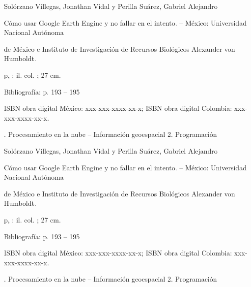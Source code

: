 \newpage

\vspace*{\fill}
\begin{center}
    \begin{blackbox}
        {\footnotesize Solórzano Villegas, Jonathan Vidal y Perilla Suárez, Gabriel Alejandro

        \quad Cómo usar Google Earth Engine y no fallar en el intento. – México: Universidad Nacional Autónoma 
            
        \quad de México e Instituto de Investigación de Recursos Biológicos Alexander von Humboldt.

         p, : il. col. ; 27 cm.

        \quad Bibliografía: p. 193 – 195

        \quad ISBN obra digital México: xxx-xxx-xxxx-xx-x; ISBN obra digital Colombia: xxx-xxx-xxxx-xx-x.

        . Procesamiento en la nube – Información geoespacial 2. Programación}
        
    \end{blackbox}
    \begin{blackbox}
        {\footnotesize Solórzano Villegas, Jonathan Vidal y Perilla Suárez, Gabriel Alejandro

        \quad Cómo usar Google Earth Engine y no fallar en el intento. – México: Universidad Nacional Autónoma 
            
        \quad de México e Instituto de Investigación de Recursos Biológicos Alexander von Humboldt.

         p, : il. col. ; 27 cm.

        \quad Bibliografía: p. 193 – 195

        \quad ISBN obra digital México: xxx-xxx-xxxx-xx-x; ISBN obra digital Colombia: xxx-xxx-xxxx-xx-x.

        . Procesamiento en la nube – Información geoespacial 2. Programación}
        
    \end{blackbox}
\end{center}


